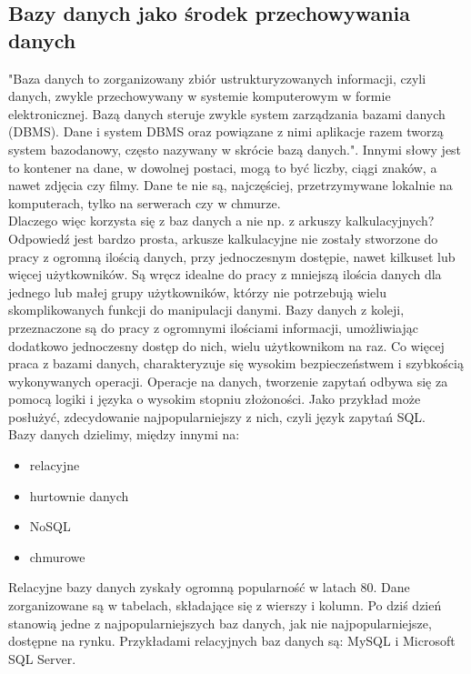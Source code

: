 \documentclass[12pt]{article}
\begin{document}
\begin{sloppypar}
{\subsection{Bazy danych jako środek przechowywania danych}
{
  "Baza danych to zorganizowany zbiór ustrukturyzowanych informacji, czyli danych, zwykle przechowywany w systemie komputerowym w formie elektronicznej. 
  Bazą danych steruje zwykle system zarządzania bazami danych (DBMS). 
  Dane i system DBMS oraz powiązane z nimi aplikacje razem tworzą system bazodanowy, często nazywany w skrócie bazą danych.". \cite{oracle-db}
  Innymi słowy jest to kontener na dane, w dowolnej postaci, mogą to być liczby, ciągi znaków, a nawet zdjęcia czy filmy. Dane te nie są, najczęściej, przetrzymywane
  lokalnie na komputerach, tylko na serwerach czy w chmurze. \\
  Dlaczego więc korzysta się z baz danych a nie np. z arkuszy kalkulacyjnych?\\
  Odpowiedź jest bardzo prosta, arkusze kalkulacyjne nie zostały stworzone do pracy z ogromną ilością danych, przy jednoczesnym dostępie, nawet kilkuset lub więcej użytkowników.
  Są wręcz idealne do pracy z mniejszą ilościa danych dla jednego lub małej grupy użytkowników, którzy nie potrzebują wielu skomplikowanych funkcji do manipulacji danymi.
  Bazy danych z koleji, przeznaczone są do pracy z ogromnymi ilościami informacji, umożliwiając dodatkowo jednoczesny dostęp do nich, wielu użytkownikom na raz. 
  Co więcej praca z bazami danych, charakteryzuje się wysokim bezpieczeństwem i szybkością wykonywanych operacji. Operacje na danych, tworzenie zapytań odbywa się 
  za pomocą logiki i języka o wysokim stopniu złożoności. Jako przykład może posłużyć, zdecydowanie najpopularniejszy z nich, czyli język zapytań SQL.\\
  Bazy danych dzielimy, między innymi na:
  \begin{itemize}
    \item relacyjne
    \item hurtownie danych
    \item NoSQL
    \item chmurowe
  \end{itemize}
  Relacyjne bazy danych zyskały ogromną popularność w latach 80\cite{oracle-db}. Dane zorganizowane są w tabelach, składające się z wierszy i kolumn. Po dziś dzień stanowią 
  jedne z najpopularniejszych baz danych, jak nie najpopularniejsze, dostępne na rynku. Przykładami relacyjnych baz danych są: MySQL i Microsoft SQL Server.\\
}}
\end{sloppypar}
\end{document}
